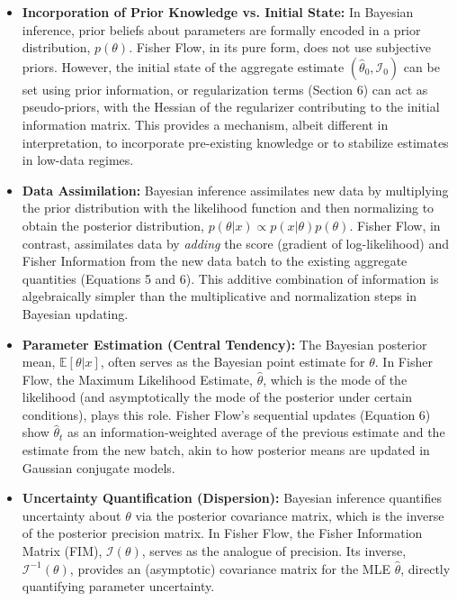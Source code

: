 \documentclass[11pt]{article}
\begin{document}
\begin{itemize}
    \item \textbf{Incorporation of Prior Knowledge vs. Initial State:}
    In Bayesian inference, prior beliefs about parameters are formally encoded in a prior distribution, $p(\theta)$. Fisher Flow, in its pure form, does not use subjective priors. However, the initial state of the aggregate estimate $(\hat\theta_0, \mathcal{I}_0)$ can be set using prior information, or regularization terms (Section 6) can act as pseudo-priors, with the Hessian of the regularizer contributing to the initial information matrix. This provides a mechanism, albeit different in interpretation, to incorporate pre-existing knowledge or to stabilize estimates in low-data regimes.

    \item \textbf{Data Assimilation:}
    Bayesian inference assimilates new data by multiplying the prior distribution with the likelihood function and then normalizing to obtain the posterior distribution, $p(\theta|x) \propto p(x|\theta)p(\theta)$. Fisher Flow, in contrast, assimilates data by \textit{adding} the score (gradient of log-likelihood) and Fisher Information from the new data batch to the existing aggregate quantities (Equations 5 and 6). This additive combination of information is algebraically simpler than the multiplicative and normalization steps in Bayesian updating.

    \item \textbf{Parameter Estimation (Central Tendency):}
    The Bayesian posterior mean, $\mathbb{E}[\theta|x]$, often serves as the Bayesian point estimate for $\theta$. In Fisher Flow, the Maximum Likelihood Estimate, $\hat{\theta}$, which is the mode of the likelihood (and asymptotically the mode of the posterior under certain conditions), plays this role. Fisher Flow's sequential updates (Equation 6) show $\hat{\theta}_t$ as an information-weighted average of the previous estimate and the estimate from the new batch, akin to how posterior means are updated in Gaussian conjugate models.

    \item \textbf{Uncertainty Quantification (Dispersion):}
    Bayesian inference quantifies uncertainty about $\theta$ via the posterior covariance matrix, which is the inverse of the posterior precision matrix. In Fisher Flow, the Fisher Information Matrix (FIM), $\mathcal{I}(\theta)$, serves as the analogue of precision. Its inverse, $\mathcal{I}^{-1}(\theta)$, provides an (asymptotic) covariance matrix for the MLE $\hat{\theta}$, directly quantifying parameter uncertainty.


\end{itemize}
\end{document}
